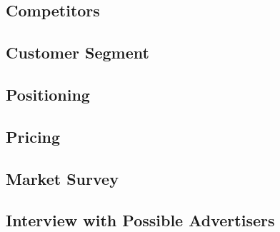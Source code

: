 \lipsum[1]

\subsection{Competitors}
\lipsum[1-2]


\subsection{Customer Segment}
\lipsum[1-2]


\subsection{Positioning}
\lipsum[1-2]


\subsection{Pricing}
\lipsum[1-2]


\subsection{Market Survey}
\lipsum[1-2]


\subsection{Interview with Possible Advertisers}
\lipsum[1-2]
